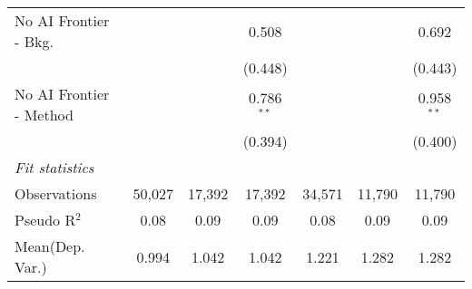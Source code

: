 \begin{tabular}{lcccccc}
   No AI Frontier - Bkg.   &              &         & 0.508        &         &         & 0.692\\   
                           &              &         & (0.448)      &         &         & (0.443)\\   
   No AI Frontier - Method &              &         & 0.786$^{**}$ &         &         & 0.958$^{**}$\\   
                           &              &         & (0.394)      &         &         & (0.400)\\   
   \midrule
   \emph{Fit statistics}\\
   Observations            & 50,027       & 17,392  & 17,392       & 34,571  & 11,790  & 11,790\\  
   Pseudo R$^2$            & 0.08         & 0.09    & 0.09         & 0.08    & 0.09    & 0.09\\  
Mean(Dep. Var.) & 0.994 & 1.042 & 1.042 & 1.221 & 1.282 & 1.282 \\
   

\end{tabular}
